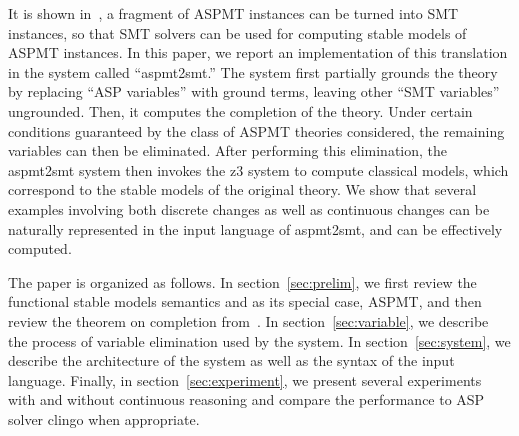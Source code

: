 \documentclass[runningheads]{llncs}
\newcommand{\cbla}{\color{black}}
\begin{document}
It is shown in~\cite{bartholomew13functional}, a fragment of
ASPMT instances can be turned into SMT instances, so that SMT solvers
can be used for computing stable models of ASPMT instances. 
In this paper, we report an implementation of this translation in the
system called ``{\sc aspmt2smt}.''  
The system first partially grounds the theory by replacing ``ASP variables'' with ground terms, leaving other ``SMT variables'' ungrounded. Then, it computes the completion
of the theory. Under certain conditions guaranteed by the class of
ASPMT theories considered, the remaining variables can then be
eliminated. After performing this elimination, the {\sc aspmt2smt} system
then invokes the {\sc z3} system to compute classical models, which
correspond to the stable models of the original theory.
We show that several examples involving both discrete changes as
well as continuous changes can be naturally represented in the input
language of {\sc aspmt2smt}, and can be effectively computed. 
\cbla

The paper is organized as follows. In section~\ref{sec:prelim}, we
first review the functional stable models semantics and as its special
case, ASPMT, and then review the theorem on completion
from~\cite{bartholomew12stable}. 
In section~\ref{sec:variable}, we describe the
process of variable elimination used by the system. In
section~\ref{sec:system}, we describe the architecture of the system as
well as the syntax of the input language. Finally, in section~\ref{sec:experiment}, we present several
experiments with and without continuous reasoning and compare the
performance to ASP solver {\sc clingo} when appropriate.




\end{document}
